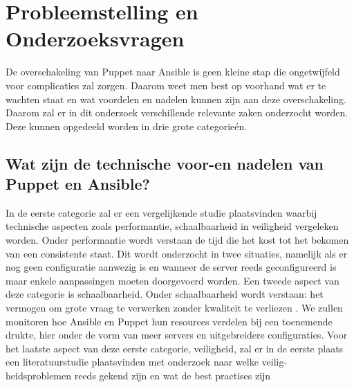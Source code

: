 \section{Probleemstelling en Onderzoeksvragen}
\label{sec:onderzoeksvragen}




De overschakeling van Puppet naar Ansible is geen kleine stap die ongetwijfeld voor complicaties zal zorgen. Daarom weet men best op voorhand wat er te wachten staat en wat voordelen en nadelen kunnen zijn aan deze overschakeling. Daarom zal er in dit onderzoek verschillende relevante zaken onderzocht worden. Deze kunnen opgedeeld worden in drie grote categorie\'en. 
\subsection{Wat zijn de technische voor-en nadelen van Puppet en Ansible?}

In de eerste categorie zal er een vergelijkende studie plaatsvinden waarbij technische aspecten zoals performantie, schaalbaarheid in veiligheid vergeleken worden. Onder performantie wordt verstaan de tijd die het kost tot het bekomen van een consistente staat. Dit wordt onderzocht in twee situaties, namelijk als er nog geen configuratie aanwezig is en wanneer de server reeds geconfigureerd is maar enkele aanpassingen moeten doorgevoerd worden. Een tweede aspect van deze categorie is schaalbaarheid. Onder schaalbaarheid wordt verstaan: het vermogen om grote vraag te verwerken zonder kwaliteit te verliezen \autocite{informit}. We zullen monitoren hoe Ansible en Puppet hun resources verdelen bij een toenemende drukte, hier onder de vorm van meer servers en uitgebreidere configuraties. Voor het laatste aspect van deze eerste categorie, veiligheid, zal er in de eerste plaats een literatuurstudie plaatsvinden met onderzoek naar welke veilig- heidsproblemen reeds gekend zijn en wat de best practises zijn


